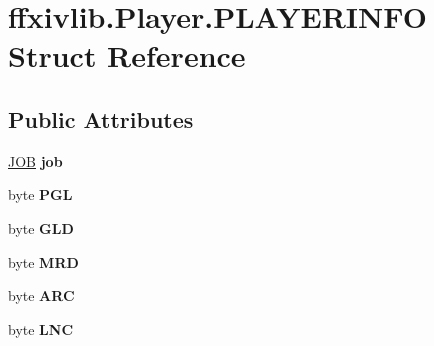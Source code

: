 \hypertarget{structffxivlib_1_1_player_1_1_p_l_a_y_e_r_i_n_f_o}{\section{ffxivlib.\-Player.\-P\-L\-A\-Y\-E\-R\-I\-N\-F\-O Struct Reference}
\label{structffxivlib_1_1_player_1_1_p_l_a_y_e_r_i_n_f_o}
}
\subsection*{Public Attributes}
\begin{DoxyCompactItemize}
\item 
\hypertarget{structffxivlib_1_1_player_1_1_p_l_a_y_e_r_i_n_f_o_aa9ae39735cc0854043e5098a392a11d0}{\hyperlink{namespaceffxivlib_a7273810711af045adb7151580e025a86}{J\-O\-B} {\bfseries job}}\label{structffxivlib_1_1_player_1_1_p_l_a_y_e_r_i_n_f_o_aa9ae39735cc0854043e5098a392a11d0}

\item 
\hypertarget{structffxivlib_1_1_player_1_1_p_l_a_y_e_r_i_n_f_o_a02da933d2d2a5fd52f48985c32766362}{byte {\bfseries P\-G\-L}}\label{structffxivlib_1_1_player_1_1_p_l_a_y_e_r_i_n_f_o_a02da933d2d2a5fd52f48985c32766362}

\item 
\hypertarget{structffxivlib_1_1_player_1_1_p_l_a_y_e_r_i_n_f_o_ae92ce14749b8bef22302c93f8b6fcc06}{byte {\bfseries G\-L\-D}}\label{structffxivlib_1_1_player_1_1_p_l_a_y_e_r_i_n_f_o_ae92ce14749b8bef22302c93f8b6fcc06}

\item 
\hypertarget{structffxivlib_1_1_player_1_1_p_l_a_y_e_r_i_n_f_o_a419071b0828fa14f989c7a658f77b581}{byte {\bfseries M\-R\-D}}\label{structffxivlib_1_1_player_1_1_p_l_a_y_e_r_i_n_f_o_a419071b0828fa14f989c7a658f77b581}

\item 
\hypertarget{structffxivlib_1_1_player_1_1_p_l_a_y_e_r_i_n_f_o_a8538e2e919f6735bd62c1e810148855f}{byte {\bfseries A\-R\-C}}\label{structffxivlib_1_1_player_1_1_p_l_a_y_e_r_i_n_f_o_a8538e2e919f6735bd62c1e810148855f}

\item 
\hypertarget{structffxivlib_1_1_player_1_1_p_l_a_y_e_r_i_n_f_o_a160d923c83dd5d1c3b94f0c402d92412}{byte {\bfseries L\-N\-C}}\label{structffxivlib_1_1_player_1_1_p_l_a_y_e_r_i_n_f_o_a160d923c83dd5d1c3b94f0c402d92412}


\end{DoxyCompactItemize}
